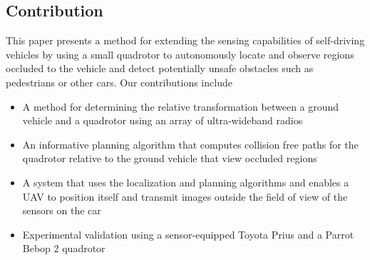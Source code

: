 \subsection{Contribution}

This paper presents a method for extending the sensing capabilities of
self-driving vehicles by using a small quadrotor to autonomously locate and
observe regions occluded to the vehicle and detect potentially unsafe obstacles
such as pedestrians or other cars. Our contributions include

\begin{itemize}

    \item A method for determining the relative transformation between a
        ground vehicle and a quadrotor using an array of ultra-wideband radios

    \item An informative planning algorithm that computes collision free paths
        for the quadrotor relative to the ground vehicle that view occluded
        regions

    \item A system that uses the localization and planning algorithms and
        enables a UAV to position itself and transmit images outside the field
        of view of the sensors on the car

    \item Experimental validation using a sensor-equipped Toyota Prius and a
        Parrot Bebop 2 quadrotor

\end{itemize}

